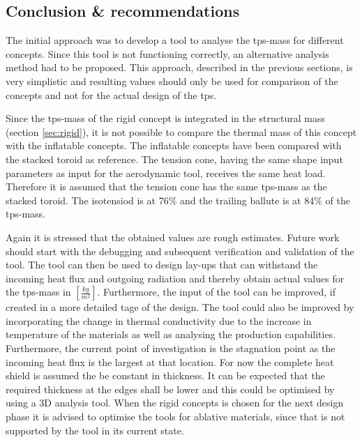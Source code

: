 \subsection{Conclusion \& recommendations}
The initial approach was to develop a tool to analyse the \gls{tps}-mass for different concepts. Since this tool is not functioning correctly, an alternative analysis method had to be proposed. This approach, described in the previous sections, is very simplistic and resulting values should only be used for comparison of the concepts and not for the actual design of the \gls{tps}.

Since the \gls{tps}-mass of the rigid concept is integrated in the structural mass (section \ref{sec:rigid}), it is not possible to compare the thermal mass of this concept with the inflatable concepts. The inflatable concepts have been compared with the stacked toroid as reference. The tension cone, having the same shape input parameters as input for the aerodynamic tool, receives the same heat load. Therefore it is assumed that the tension cone has the same \gls{tps}-mass as the stacked toroid. The isotensiod is at 76\% and the trailing ballute is at 84\% of the \gls{tps}-mass.

Again it is stressed that the obtained values are rough estimates. Future work should start with the debugging and subsequent verification and validation of the tool. The tool can then be used to design lay-ups that can withstand the incoming heat flux and outgoing radiation and thereby obtain actual values for the \gls{tps}-mass in $\left[\frac{kg}{m^2}\right]$. Furthermore, the input of the tool can be improved, if created in a more detailed tage of the design. The tool could also be improved by incorporating the change in thermal conductivity due to the increase in temperature of the materials as well as analysing the production capabilities. Furthermore, the current point of investigation is the stagnation point as the incoming heat flux is the largest at that location. For now the complete heat shield is assumed the be constant in thickness. It can be expected that the required thickness at the edges shall be lower and this could be optimised by using a 3D analysis tool. When the rigid concepts is chosen for the next design phase it is advised to optimise the tools for ablative materials, since that is not supported by the tool in its current state.


